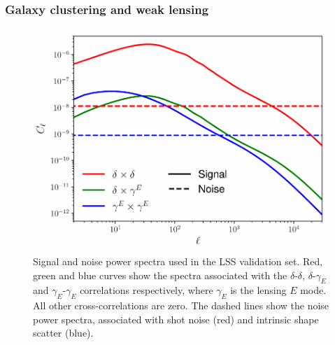 \documentclass[usenatbib]{mnrasb}
\begin{document}
      \subsubsection{Galaxy clustering and weak lensing} \label{sssec:validation.suite.lss}
        \begin{figure}
          \centering
          \includegraphics[width=0.99\columnwidth]{cls_lss}
          \caption{Signal and noise power spectra used in the LSS validation set. Red, green and blue curves show the spectra associated with the $\delta$-$\delta$, $\delta$-$\gamma_E$ and $\gamma_E$-$\gamma_E$ correlations respectively, where $\gamma_E$ is the lensing $E$ mode. All other cross-correlations are zero. The dashed lines show the noise power spectra, associated with shot noise (red) and intrinsic shape scatter (blue).} \label{fig:lss_cls}
        \end{figure}
\end{document}
